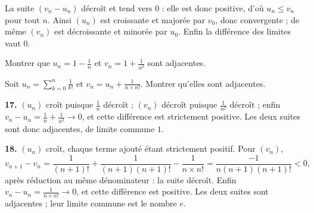 \begin{demonstration}
La suite $(v_{n}-u_{n})$ décroît et tend vers $0$ : elle est donc positive,
d'où $u_{n} \leq v_{n}$ pour tout $n$. Ainsi $(u_{n})$ est croissante et
majorée par $v_{0}$, donc convergente ; de même $(v_{n})$ est décroissante et
minorée par $u_{0}$. Enfin la différence des limites vaut $0$.
\end{demonstration}

\begin{entrainement}
\exo[\niveau{2}] Montrer que $u_{n} = 1-\frac1n$ et $v_{n} = 1+\frac{1}{n^{2}}$
sont adjacentes.

\exo[\niveau{3}] Soit $u_{n} = \displaystyle\sum_{k=0}^{n}\frac{1}{k!}$ et
$v_{n} = u_{n}+\frac{1}{n\times n!}$. Montrer qu'elles sont adjacentes.
\end{entrainement}

\begin{corrige}
\textbf{17.} $(u_{n})$ croît puisque $\frac1n$ décroît ; $(v_{n})$ décroît
puisque $\frac{1}{n^{2}}$ décroît ; enfin
$v_{n}-u_{n} = \frac1n+\frac{1}{n^{2}} \to 0$, et cette différence est
strictement positive. Les deux suites sont donc adjacentes, de limite commune
$1$.

\textbf{18.} $(u_{n})$ croît, chaque terme ajouté étant strictement positif.
Pour $(v_{n})$,
\[
  v_{n+1}-v_{n} = \frac{1}{(n+1)!}+\frac{1}{(n+1)(n+1)!}-\frac{1}{n\times n!}
  = \frac{-1}{n(n+1)(n+1)!} < 0,
\]
après réduction au même dénominateur : la suite décroît. Enfin
$v_{n}-u_{n} = \frac{1}{n\times n!} \to 0$, et cette différence est positive.
Les deux suites sont adjacentes ; leur limite commune est le nombre $e$.
\end{corrige}

